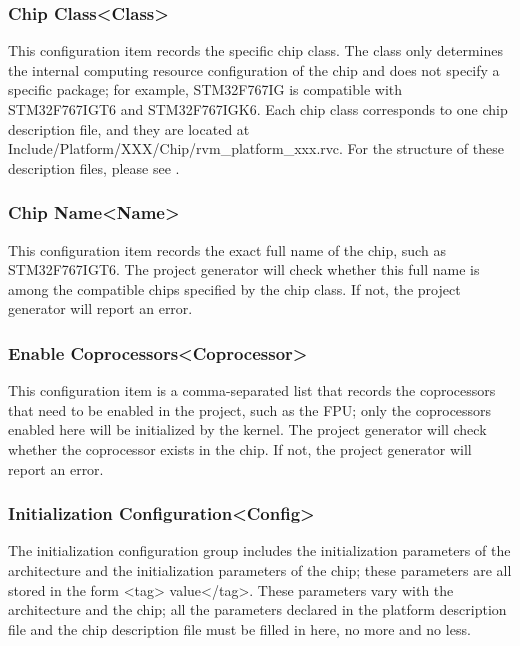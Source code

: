 \subsubsection{Chip Class<Class>{}}\label{subsubsec:5-3-9-2}

This configuration item records the specific chip class. The class only determines the internal computing resource configuration of the chip and does not specify a specific package; for example, STM32F767IG is compatible with STM32F767IGT6 and STM32F767IGK6. Each chip class corresponds to one chip description file, and they are located at Include/Platform/XXX/Chip/rvm\_platform\_xxx.rvc. For the structure of these description files, please see .

\subsubsection{Chip Name<Name>{}}\label{subsubsec:5-3-9-3}

This configuration item records the exact full name of the chip, such as STM32F767IGT6. The project generator will check whether this full name is among the compatible chips specified by the chip class. If not, the project generator will report an error.

\subsubsection{Enable Coprocessors<Coprocessor>{}}\label{subsubsec:5-3-9-4}

This configuration item is a comma-separated list that records the coprocessors that need to be enabled in the project, such as the FPU; only the coprocessors enabled here will be initialized by the kernel. The project generator will check whether the coprocessor exists in the chip. If not, the project generator will report an error.

\subsubsection{Initialization Configuration<Config>{}}\label{subsubsec:5-3-9-5}

The initialization configuration group includes the initialization parameters of the architecture and the initialization parameters of the chip; these parameters are all stored in the form <tag> value</tag>. These parameters vary with the architecture and the chip; all the parameters declared in the platform description file and the chip description file must be filled in here, no more and no less.


